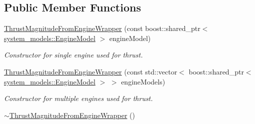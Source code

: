 \subsection*{Public Member Functions}
\begin{DoxyCompactItemize}
\item 
\hyperlink{classtudat_1_1propulsion_1_1ThrustMagnitudeFromEngineWrapper_a476636d4bc1ed26c3120c8d42757b849}{Thrust\+Magnitude\+From\+Engine\+Wrapper} (const boost\+::shared\+\_\+ptr$<$ \hyperlink{classtudat_1_1system__models_1_1EngineModel}{system\+\_\+models\+::\+Engine\+Model} $>$ engine\+Model)
\begin{DoxyCompactList}\small\item\em Constructor for single engine used for thrust. \end{DoxyCompactList}\item 
\hyperlink{classtudat_1_1propulsion_1_1ThrustMagnitudeFromEngineWrapper_ac8bff624e3ae4b38ccb15dbaa353ccfc}{Thrust\+Magnitude\+From\+Engine\+Wrapper} (const std\+::vector$<$ boost\+::shared\+\_\+ptr$<$ \hyperlink{classtudat_1_1system__models_1_1EngineModel}{system\+\_\+models\+::\+Engine\+Model} $>$ $>$ engine\+Models)
\begin{DoxyCompactList}\small\item\em Constructor for multiple engines used for thrust. \end{DoxyCompactList}\item 
\hyperlink{classtudat_1_1propulsion_1_1ThrustMagnitudeFromEngineWrapper_ad217c8d2a8cc9a231b0ecebea503539e}{$\sim$\+Thrust\+Magnitude\+From\+Engine\+Wrapper} ()\hypertarget{classtudat_1_1propulsion_1_1ThrustMagnitudeFromEngineWrapper_ad217c8d2a8cc9a231b0ecebea503539e}{}\label{classtudat_1_1propulsion_1_1ThrustMagnitudeFromEngineWrapper_ad217c8d2a8cc9a231b0ecebea503539e}


\end{DoxyCompactItemize}
